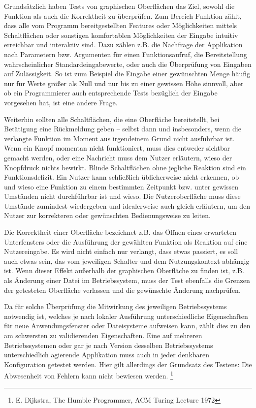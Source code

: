 Grundsätzlich haben Tests von graphischen Oberflächen das Ziel, sowohl die
Funktion als auch die Korrektheit zu überprüfen. Zum Bereich Funktion zählt,
dass alle vom Programm bereitgestellten Features oder Möglichkeiten mittels
Schaltflächen oder sonstigen komfortablen Möglichkeiten der Eingabe
intuitiv erreichbar und interaktiv sind. Dazu zählen z.B. die Nachfrage
der Applikation nach Parametern bzw. Argumenten für einen Funktionsaufruf,
die Bereitstellung wahrscheinlicher Standardeingabewerte, oder auch die
Überprüfung von Eingaben auf Zulässigkeit. So ist zum Beispiel die
Eingabe einer gewünschten Menge häufig nur für Werte größer als Null
und nur bis zu einer gewissen Höhe sinnvoll, aber ob ein Programmierer
auch entsprechende Tests bezüglich der Eingabe vorgesehen hat, ist
eine andere Frage.

Weiterhin sollten alle Schaltflächen, die eine Oberfläche bereitstellt,
bei Betätigung eine Rückmeldung geben -- selbst dann und insbesonders, wenn die verlangte
Funktion im Moment aus irgendeinem Grund nicht ausführbar ist.
Wenn ein Knopf momentan nicht funktioniert, muss dies entweder sichtbar gemacht werden,
oder eine Nachricht muss dem Nutzer erläutern, wieso der Knopfdruck nichts bewirkt.
\glqq{}Blinde\grqq{} Schaltflächen ohne jegliche Reaktion sind ein Funktionsdefizit.
Ein Nutzer kann schließlich üblicherweise nicht erkennen, ob und wieso eine Funktion
zu einem bestimmten Zeitpunkt bzw. unter gewissen Umständen nicht durchführbar ist
und wieso. Die Nutzeroberfläche muss diese Umstände zumindest wiedergeben
und idealerweise auch gleich erläutern, um den Nutzer zur korrekteren oder gewünschten
Bedienungsweise zu leiten.

Die Korrektheit einer Oberfläche bezeichnet z.B. das Öffnen eines erwarteten
Unterfensters oder die Ausführung der gewählten Funktion als Reaktion auf eine
Nutzereingabe. Es wird nicht einfach nur verlangt, dass etwas passiert, es soll
auch etwas sein, das vom jeweiligen Schalter und dem Nutzungskontext abhängig ist.
Wenn dieser Effekt außerhalb der graphischen Oberfläche zu finden ist, z.B.
als Änderung einer Datei im Betriebssystem, muss der Test ebenfalls die Grenzen
der getesteten Oberfläche verlassen und die gewünschte Änderung nachprüfen.

Da für solche Überprüfung die Mitwirkung des jeweiligen Betriebssystems notwendig
ist, welches je nach lokaler Ausführung unterschiedliche Eigenschaften für neue
Anwendungsfenster oder Dateisysteme aufweisen kann, zählt dies zu den am schwersten
zu validierenden Eigenschaften. Eine auf mehreren Betriebssystemen oder gar je
nach Version desselben Betriebssystems unterschiedlich agierende Applikation muss auch
in jeder denkbaren Konfiguration getestet werden. Hier gilt allerdings der
Grundsatz des Testens: \glqq{}Die Abwesenheit von Fehlern kann nicht bewiesen werden.\grqq{}
\footnote{E. Dijkstra, The Humble Programmer, ACM Turing Lecture 1972}

